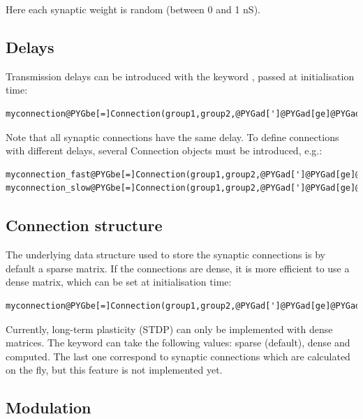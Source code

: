 \documentclass[letterpaper,10pt]{manual}
\begin{document}
Here each synaptic weight is random (between 0 and 1 nS).


\subsection{Delays}

Transmission delays can be introduced with the keyword , passed at initialisation time:

\begin{Verbatim}[commandchars=@\[\]]
myconnection@PYGbe[=]Connection(group1,group2,@PYGad[']@PYGad[ge]@PYGad['],delay@PYGbe[=]@PYGaw[3]@PYGbe[*]ms)
\end{Verbatim}

Note that all synaptic connections have the same delay. To define connections with different delays,
several Connection objects must be introduced, e.g.:

\begin{Verbatim}[commandchars=@\[\]]
myconnection_fast@PYGbe[=]Connection(group1,group2,@PYGad[']@PYGad[ge]@PYGad['],delay@PYGbe[=]@PYGaw[1]@PYGbe[*]ms)
myconnection_slow@PYGbe[=]Connection(group1,group2,@PYGad[']@PYGad[ge]@PYGad['],delay@PYGbe[=]@PYGaw[5]@PYGbe[*]ms)
\end{Verbatim}


\subsection{Connection structure}

The underlying data structure used to store the synaptic connections is by default a sparse
matrix. If the connections are dense, it is more efficient to use a dense matrix, which can be
set at initialisation time:

\begin{Verbatim}[commandchars=@\[\]]
myconnection@PYGbe[=]Connection(group1,group2,@PYGad[']@PYGad[ge]@PYGad['],structure@PYGbe[=]@PYGad[']@PYGad[dense]@PYGad['])
\end{Verbatim}

Currently, long-term plasticity (STDP) can only be implemented with dense matrices.
The  keyword can take the following values: sparse (default), dense and
computed. The last one correspond to synaptic connections which are calculated on the fly,
but this feature is not implemented yet.


\subsection{Modulation}
\end{document}

